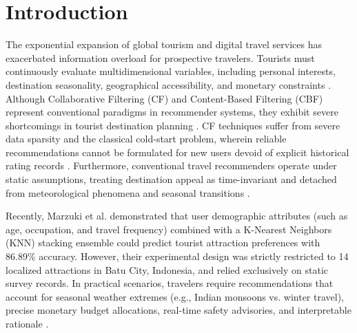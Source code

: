 \documentclass[conference]{IEEEtran}
\begin{document}
\section{Introduction}
The exponential expansion of global tourism and digital travel services has exacerbated information overload for prospective travelers. Tourists must continuously evaluate multidimensional variables, including personal interests, destination seasonality, geographical accessibility, and monetary constraints \cite{borras2014intelligent}. Although Collaborative Filtering (CF) and Content-Based Filtering (CBF) represent conventional paradigms in recommender systems, they exhibit severe shortcomings in tourist destination planning \cite{burke2002hybrid}. CF techniques suffer from severe data sparsity and the classical cold-start problem, wherein reliable recommendations cannot be formulated for new users devoid of explicit historical rating records \cite{pazzani1999framework}. Furthermore, conventional travel recommenders operate under static assumptions, treating destination appeal as time-invariant and detached from meteorological phenomena and seasonal transitions \cite{adomavicius2011context}.

Recently, Marzuki et al. \cite{marzuki2025knn} demonstrated that user demographic attributes (such as age, occupation, and travel frequency) combined with a K-Nearest Neighbors (KNN) stacking ensemble could predict tourist attraction preferences with 86.89\% accuracy. However, their experimental design was strictly restricted to 14 localized attractions in Batu City, Indonesia, and relied exclusively on static survey records. In practical scenarios, travelers require recommendations that account for seasonal weather extremes (e.g., Indian monsoons vs. winter travel), precise monetary budget allocations, real-time safety advisories, and interpretable rationale \cite{yoon2023realtime, zhang2020explainable}.
\end{document}
